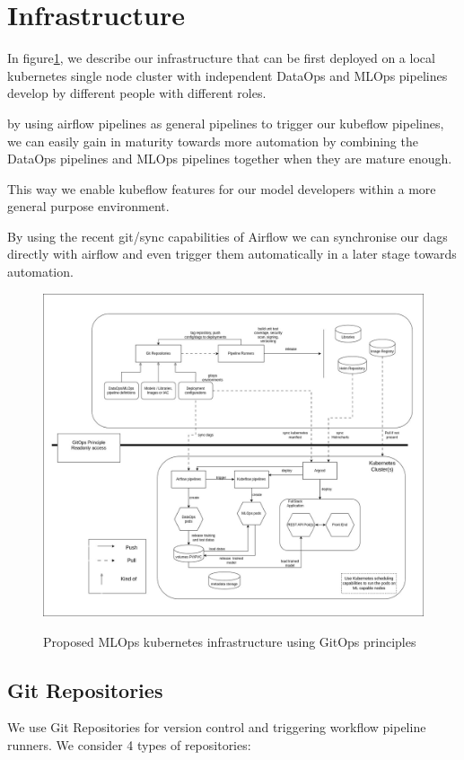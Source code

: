 \section{Infrastructure}\label{sec:infrastructure}

In figure\ref{fig:project-infra}, we describe our infrastructure that can be first deployed on a local kubernetes single node cluster
with independent DataOps and MLOps pipelines develop by different people with different roles.

by using airflow pipelines as general pipelines to trigger our kubeflow pipelines, we can easily gain in maturity towards
more automation by combining the DataOps pipelines and MLOps pipelines together when they are mature enough.

This way we enable kubeflow features for our model developers within a more general purpose environment.

By using the recent git/sync capabilities of Airflow we can synchronise our dags directly with airflow and
even trigger them automatically in a later stage towards automation.

\begin{figure}[!htbp]
    \centering
    \caption{Proposed MLOps kubernetes infrastructure using GitOps principles}
    \includegraphics[scale=0.35]{images/project/mthmlops-infra}
    \label{fig:project-infra}
\end{figure}


\subsection{Git Repositories}\label{subsec:git-repositories}
We use Git Repositories for version control and triggering workflow pipeline runners.
We consider 4 types of repositories:

